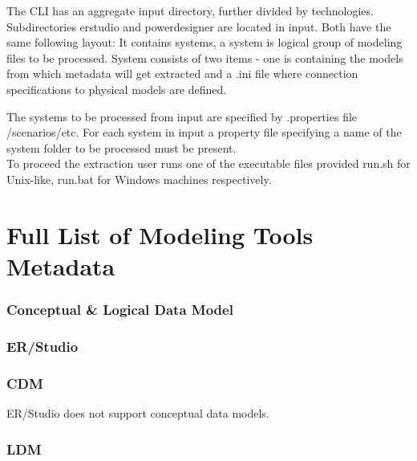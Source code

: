 \documentclass[12pt,a4paper]{report}
\begin{document}
The CLI has an aggregate input directory, further divided by technologies.
Subdirectories erstudio and powerdesigner are located in input.  
Both have the same following layout: 
It contains systems, a system is logical group of modeling files to be processed.
System consists of two items - one is containing the models from which metadata will get extracted and a .ini file where connection specifications to physical models are defined.

The systems to be processed from input are specified by .properties file   /scenarios/etc. 
For each system in input a property file specifying a name of the system folder to be processed must be present. \\ 

To proceed the extraction user runs one of the executable files provided \textunderscore run.sh for Unix-like, \textunderscore run.bat for Windows machines respectively.

\section{Full List of Modeling Tools Metadata}
\label{full_list_metadata}

\subsubsection{Conceptual \& Logical Data Model}

\subsubsection{ER/Studio}

\subsubsection{CDM}

ER/Studio does not support conceptual data models.

\subsubsection{LDM}
\end{document}
